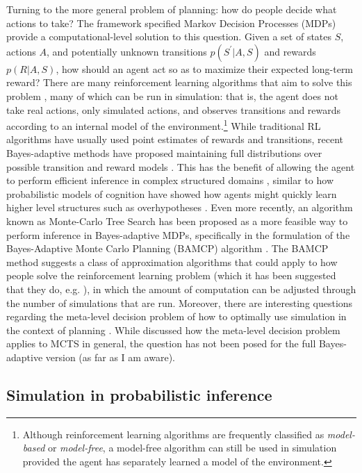 \documentclass[12pt]{article}
\begin{document}
Turning to the more general problem of planning: how do people decide what actions to take? The framework specified Markov Decision Processes (MDPs) provide a computational-level solution to this question. Given a set of states $S$, actions $A$, and potentially unknown transitions $p(S^\prime|A,S)$ and rewards $p(R|A,S)$, how should an agent act so as to maximize their expected long-term reward? There are many reinforcement learning algorithms that aim to solve this problem \citep{Sutton1998}, many of which can be run in simulation: that is, the agent does not take real actions, only simulated actions, and observes transitions and rewards according to an internal model of the environment.\footnote{Although reinforcement learning algorithms are frequently classified as \textit{model-based} or \textit{model-free}, a model-free algorithm can still be used in simulation provided the agent has separately learned a model of the environment.} While traditional RL algorithms have usually used point estimates of rewards and transitions, recent Bayes-adaptive methods have proposed maintaining full distributions over possible transition and reward models \citep{Dearden1999}. This has the benefit of allowing the agent to perform efficient inference in complex structured domains \citep{Ross2008}, similar to how probabilistic models of cognition have showed how agents might quickly learn higher level structures such as overhypotheses \citep{Kemp2007}. Even more recently, an algorithm known as Monte-Carlo Tree Search \citep{Browne2012} has been proposed as a more feasible way to perform inference in Bayes-adaptive MDPs, specifically in the formulation of the Bayes-Adaptive Monte Carlo Planning (BAMCP) algorithm \citep{Guez2013}. The BAMCP method suggests a class of approximation algorithms that could apply to how people solve the reinforcement learning problem (which it has been suggested that they do, e.g. \cite{Baker2014}), in which the amount of computation can be adjusted through the number of simulations that are run. Moreover, there are interesting questions regarding the meta-level decision problem of how to optimally use simulation in the context of planning \citep{Hay2012}. While \cite{Hay2012} discussed how the meta-level decision problem applies to MCTS in general, the question has not been posed for the full Bayes-adaptive version (as far as I am aware).

\subsection*{Simulation in probabilistic inference}
\end{document}
